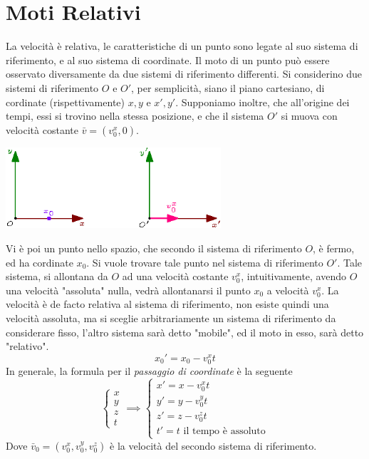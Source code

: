 \documentclass[10pt, letterpaper]{report}
\begin{document}
\section{Moti Relativi}
La velocità è relativa, le caratteristiche di un punto sono legate al suo sistema di riferimento, e 
al suo sistema di coordinate. Il moto di un punto può essere osservato diversamente da due sistemi 
di riferimento differenti.\acc 
Si considerino due sistemi di riferimento $O$ e $O'$, per semplicità, siano il piano cartesiano, di 
cordinate (rispettivamente) $x,y$ e $x',y'$. Supponiamo inoltre, che all'origine dei tempi, essi 
si trovino nella stessa posizione, e che il sistema $O'$ si muova con velocità costante $\bar v = (v_0^x,0)$.
\begin{center}
    \includegraphics[width=0.6\textwidth]{images/sistemiRif.eps}
    \end{center}
Vi è poi un punto nello spazio, che secondo il sistema di riferimento $O$, è fermo, ed ha cordinate $x_0$. 
Si vuole trovare tale punto nel sistema di riferimento $O'$. Tale sistema, si allontana da $O$ ad una 
velocità costante $v_0^x$, intuitivamente, avendo $O$ una velocità "assoluta" nulla,
 vedrà allontanarsi il punto $x_0$ a velocità $v_0^x$. La velocità è de facto relativa al sistema di riferimento, 
 non esiste quindi una velocità assoluta, ma si sceglie arbitrariamente un sistema di riferimento 
 da considerare fisso, l'altro sistema sarà detto "mobile", ed il moto in esso, sarà 
 detto "relativo". 
 $$x_0'=x_0-v_0^xt$$
In generale, la formula per il \textit{passaggio di coordinate} è la seguente
$$\begin{cases}
    x\\ y\\ z\\ t
\end{cases} \implies \begin{cases}
    x' = x-v_0^x t\\ 
    y' = y-v_0^y t\\ 
    z' = z-v_0^z t\\ 
    t'=t \text{ il tempo è assoluto}
\end{cases}$$
Dove $\bar v_0=(v_0^x,v_0^y,v_0^z)$ è la velocità del secondo sistema di riferimento.
\end{document}
